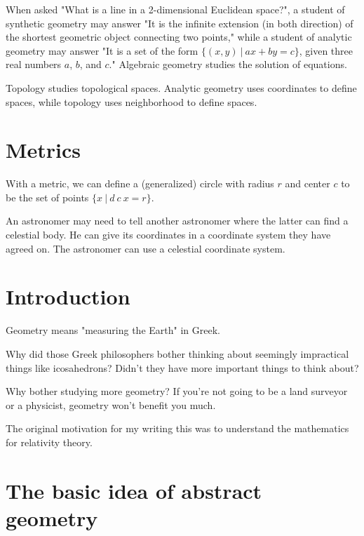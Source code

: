 When asked "What is a line in a 2-dimensional Euclidean space?",
a student of
synthetic geometry
may answer "It is the infinite extension (in both direction)
of the shortest geometric object connecting two points,"
while a student of
analytic geometry
may answer
"It is a set of the form $\{ (x,y) ~|~ ax+by=c \}$, given three real numbers $a$, $b$, and $c$."
Algebraic geometry studies the solution of equations.

Topology studies topological spaces.
Analytic geometry uses coordinates to define spaces,
while topology uses neighborhood to define spaces.

\section{Metrics}

With a metric, we can define
a (generalized) circle with radius $r$ and center $c$
to be the set of points
$\{x ~|~ d~c~x = r \}$.

An astronomer may need to tell another astronomer where the latter can find a celestial body.
He can give its coordinates in a coordinate system they have agreed on.
The astronomer can use a celestial coordinate system.

\section{Introduction}

Geometry means "measuring the Earth" in Greek.

Why did those Greek philosophers bother thinking about seemingly impractical things like icosahedrons?
Didn't they have more important things to think about?

Why bother studying more geometry?
If you're not going to be a land surveyor or a physicist,
geometry won't benefit you much.

The original motivation for my writing this was to understand the mathematics for relativity theory.

\section{The basic idea of abstract geometry}

